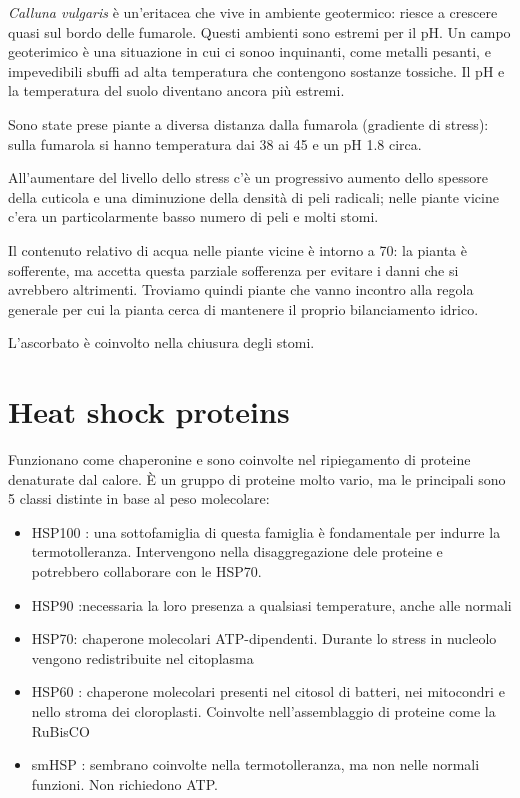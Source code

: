 \documentclass[a4paper,12pt]{book}
\begin{document}
\emph{Calluna vulgaris} è un'eritacea che vive in ambiente geotermico: riesce a crescere quasi sul bordo delle fumarole. Questi ambienti sono estremi per il pH. Un campo geoterimico è una situazione in cui ci sonoo inquinanti, come metalli pesanti, e impevedibili sbuffi ad alta temperatura che contengono sostanze tossiche. Il pH e la temperatura del suolo diventano ancora più estremi.

Sono state prese piante a diversa distanza dalla fumarola (gradiente di stress): sulla fumarola si hanno temperatura dai 38 ai 45 \textcelsius e un pH 1.8 circa.


All'aumentare del livello dello stress c'è un progressivo aumento dello spessore della cuticola e una diminuzione della densità di peli radicali; nelle piante vicine c'era un particolarmente basso numero di peli e molti stomi.

Il contenuto relativo di acqua nelle piante vicine è intorno a 70: la pianta è sofferente, ma accetta questa parziale sofferenza per evitare i danni che si avrebbero altrimenti. Troviamo quindi piante che vanno incontro alla regola generale per cui la pianta cerca di mantenere il proprio bilanciamento idrico.

L'ascorbato è coinvolto nella chiusura degli stomi.

\section{Heat shock proteins}
Funzionano come chaperonine e sono coinvolte nel ripiegamento di proteine denaturate dal calore. È un gruppo di proteine molto vario, ma le principali sono 5 classi distinte in base al peso molecolare:
\begin{itemize}
\item{HSP100 : una sottofamiglia di questa famiglia è fondamentale per indurre la termotolleranza.
Intervengono nella disaggregazione dele proteine e potrebbero collaborare con le HSP70.}
\item{HSP90 :necessaria la loro presenza a qualsiasi temperature, anche alle normali}
 \item{HSP70: chaperone molecolari ATP-dipendenti. Durante lo stress in nucleolo vengono redistribuite nel citoplasma}
 \item{HSP60 : chaperone molecolari presenti nel citosol di batteri, nei mitocondri e nello stroma dei cloroplasti. Coinvolte nell'assemblaggio di proteine come la RuBisCO}
 \item{smHSP : sembrano coinvolte nella termotolleranza, ma non nelle normali funzioni. Non richiedono ATP.}
 \end{itemize}
 
\end{document}
